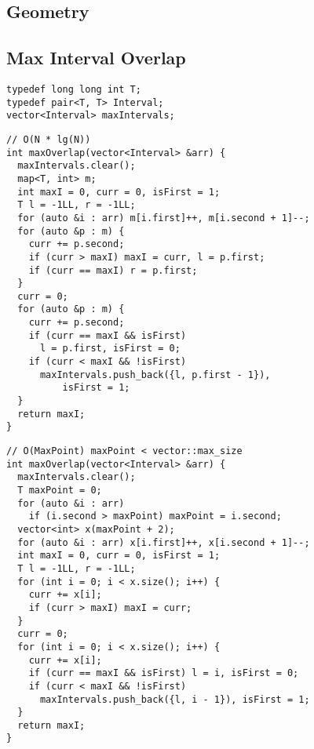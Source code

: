 \documentclass[twoside]{article}
\begin{document}
\begin{multicols*}{2}
\sectionfont{\bfseries\sffamily\centering\Huge}
\vspace{1em}
\section*{Geometry}
\vspace{3em}
\subsectionfont{\large\bfseries\sffamily\underline}
\subsection*{Max Interval Overlap}
\begin{verbatim}
typedef long long int T;
typedef pair<T, T> Interval;
vector<Interval> maxIntervals;
\end{verbatim}
\vspace{-12pt}
\begin{verbatim}
// O(N * lg(N))
int maxOverlap(vector<Interval> &arr) {
  maxIntervals.clear();
  map<T, int> m;
  int maxI = 0, curr = 0, isFirst = 1;
  T l = -1LL, r = -1LL;
  for (auto &i : arr) m[i.first]++, m[i.second + 1]--;
  for (auto &p : m) {
    curr += p.second;
    if (curr > maxI) maxI = curr, l = p.first;
    if (curr == maxI) r = p.first;
  }
  curr = 0;
  for (auto &p : m) {
    curr += p.second;
    if (curr == maxI && isFirst)
      l = p.first, isFirst = 0;
    if (curr < maxI && !isFirst)
      maxIntervals.push_back({l, p.first - 1}),
          isFirst = 1;
  }
  return maxI;
}
\end{verbatim}
\vspace{-12pt}
\begin{verbatim}
// O(MaxPoint) maxPoint < vector::max_size
int maxOverlap(vector<Interval> &arr) {
  maxIntervals.clear();
  T maxPoint = 0;
  for (auto &i : arr)
    if (i.second > maxPoint) maxPoint = i.second;
  vector<int> x(maxPoint + 2);
  for (auto &i : arr) x[i.first]++, x[i.second + 1]--;
  int maxI = 0, curr = 0, isFirst = 1;
  T l = -1LL, r = -1LL;
  for (int i = 0; i < x.size(); i++) {
    curr += x[i];
    if (curr > maxI) maxI = curr;
  }
  curr = 0;
  for (int i = 0; i < x.size(); i++) {
    curr += x[i];
    if (curr == maxI && isFirst) l = i, isFirst = 0;
    if (curr < maxI && !isFirst)
      maxIntervals.push_back({l, i - 1}), isFirst = 1;
  }
  return maxI;
}
\end{verbatim}


\end{multicols*}
\end{document}
